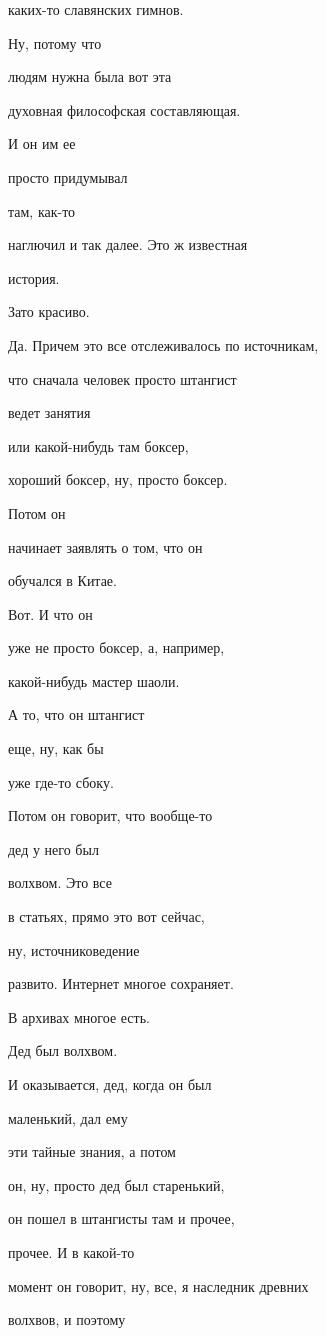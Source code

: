 каких-то славянских гимнов.

Ну, потому что

людям нужна была вот эта

духовная философская составляющая.

И он им ее

просто придумывал

там, как-то

наглючил и так далее. Это ж известная

история.

Зато красиво.

Да. Причем это все отслеживалось по источникам,

что сначала человек просто штангист

ведет занятия

или какой-нибудь там боксер,

хороший боксер, ну, просто боксер.

Потом он

начинает заявлять о том, что он

обучался в Китае.

Вот. И что он

уже не просто боксер, а, например,

какой-нибудь мастер шаоли.

А то, что он штангист

еще, ну, как бы

уже где-то сбоку.

Потом он говорит, что вообще-то

дед у него был

волхвом. Это все

в статьях, прямо это вот сейчас,

ну, источниковедение

развито. Интернет многое сохраняет.

В архивах многое есть.

Дед был волхвом.

И оказывается, дед, когда он был

маленький, дал ему

эти тайные знания, а потом

он, ну, просто дед был старенький,

он пошел в штангисты там и прочее,

прочее. И в какой-то

момент он говорит, ну, все, я наследник древних

волхвов, и поэтому

